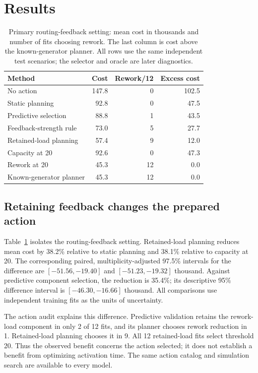 \section{Results}
\begin{table}[t]\caption{Primary routing-feedback setting: mean cost in thousands and number of fits choosing rework. The last column is cost above the known-generator planner. All rows use the same independent test scenarios; the selector and oracle are later diagnostics.}\label{tab:primary}\centering\small\setlength{\tabcolsep}{3pt}
\begin{tabular}{p{}rrr}\toprule
Method & Cost & Rework/12 & Excess cost\\\midrule
No action & 147.8 & 0 & 102.5 \\
Static planning & 92.8 & 0 & 47.5 \\
Predictive selection & 88.8 & 1 & 43.5 \\
Feedback-strength rule & 73.0 & 5 & 27.7 \\
Retained-load planning & 57.4 & 9 & 12.0 \\
Capacity at 20 & 92.6 & 0 & 47.3 \\
Rework at 20 & 45.3 & 12 & 0.0 \\
Known-generator planner & 45.3 & 12 & 0.0 \\
\bottomrule\end{tabular}\end{table}
\subsection{Retaining feedback changes the prepared action}
Table~\ref{tab:primary} isolates the routing-feedback setting. Retained-load planning reduces mean cost by 38.2\% relative to static planning and 38.1\% relative to capacity at 20. The corresponding paired, multiplicity-adjusted 97.5\% intervals for the difference are $[-51.56,-19.40]$ and $[-51.23,-19.32]$ thousand. Against predictive component selection, the reduction is 35.4\%; its descriptive 95\% difference interval is $[-46.30,-16.66]$ thousand. All comparisons use independent training fits as the units of uncertainty.

The action audit explains this difference. Predictive validation retains the rework-load component in only 2 of 12 fits, and its planner chooses rework reduction in 1. Retained-load planning chooses it in 9. All 12 retained-load fits select threshold 20. Thus the observed benefit concerns the action selected; it does not establish a benefit from optimizing activation time. The same action catalog and simulation search are available to every model.

